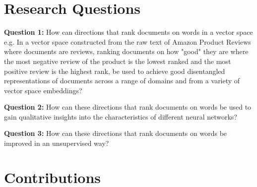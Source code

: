 
\section{Research Questions}

\textbf{Question 1:} How can directions that rank documents on words in a vector space e.g. In a vector space constructed from the raw text of Amazon Product Reviews where documents are reviews, ranking documents on how "good" they are where the most negative review of the product is the lowest ranked and the most positive review is the highest rank, be used to achieve good disentangled representations of documents across a range of domains and from a variety of vector space embeddings?

\textbf{Question 2:} How can these directions that rank documents on words be used to gain qualitative insights into the characteristics of different neural networks?

\textbf{Question 3:} How can these directions that rank documents on words be improved in an unsupervised way?

\section{Contributions}


